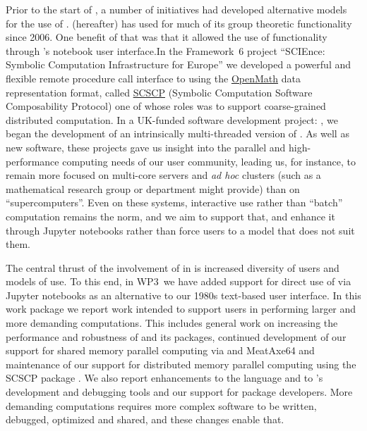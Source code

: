 Prior to the start of \ODK, a number of initiatives had developed
alternative models for the use of \GAP. \SageMath (\Sage hereafter)
has used \GAP for much of its group theoretic functionality since
2006. One benefit of that was that it allowed the use of \GAP
functionality through \Sage's notebook user interface.In the Framework~6 project
``SCIEnce: Symbolic Computation Infrastructure for Europe'' we
developed a powerful and flexible remote procedure call interface to
\GAP using the \href{https://www.openmath.org/}{OpenMath} data representation format, called
\href{https://www.openmath.org/standard/scscp/}{SCSCP}
(Symbolic Computation Software Composability Protocol) one of
whose roles was to support coarse-grained distributed computation. In
a UK-funded software development project: \HPCGAP, we began the
development of an intrinsically multi-threaded version of \GAP. As
well as new software, these projects gave us insight into the parallel
and high-performance computing needs of our user community, leading
us, for instance, to remain more focused on multi-core servers and
\textit{ad hoc} clusters (such as a mathematical research group or
department might provide) than on ``supercomputers''. Even on these
systems, interactive use rather than ``batch'' computation remains the
norm, and we aim to support that, and enhance it through Jupyter
notebooks rather than force users to a model that does not suit them.

The central thrust of the involvement of \GAP in \ODK is increased
diversity of users and models of use. To this end, in WP3~we have
added support for direct use of \GAP via Jupyter notebooks as an
alternative to our 1980s text-based user interface. In this work package we report
work intended to support \GAP users in performing larger and more
demanding computations. This includes general work on increasing the
performance and robustness of \GAP and its packages, continued
development of our support for shared memory parallel computing via
\HPCGAP and MeatAxe64 and maintenance of our support for distributed
memory parallel computing using the SCSCP package \cite{SCSCP}.
We also report enhancements to the \GAP language and to
\GAP's development and debugging tools and our support for package
developers. More demanding computations requires more complex software
to be written, debugged, optimized and shared, and these changes
enable that.

